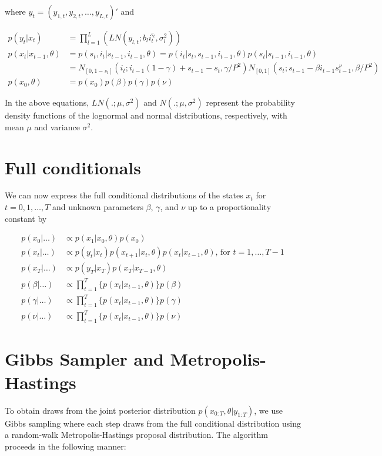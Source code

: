 \documentclass{article}
\begin{document}
\noindent where $y_t = (y_{1,t},y_{2,t},\ldots,y_{L,t})'$ and

\begin{align*}
p(y_t|x_t) &= \prod_{l=1}^L \left(LN(y_{l,t};b_li_t^{\varsigma_l},\sigma_l^2)\right) \\
p(x_t|x_{t-1},\theta) &= p(s_t,i_t|s_{t-1},i_{t-1},\theta) = p(i_t|s_t,s_{t-1},i_{t-1},\theta)p(s_t|s_{t-1},i_{t-1},\theta) \\
&= N_{[0,1-s_t]}(i_t;i_{t-1}(1 - \gamma) + s_{t-1} - s_t, \gamma / P^2)N_{[0,1]}(s_t; s_{t-1} - \beta i_{t-1}s^{\nu}_{t-1}, \beta / P^2) \\
p(x_0,\theta) &= p(x_0)p(\beta)p(\gamma)p(\nu)
\end{align*}

\noindent In the above equations, $LN(.;\mu,\sigma^2)$ and $N(.;\mu,\sigma^2)$ represent the probability density functions of the lognormal and normal distributions, respectively, with mean $\mu$ and variance $\sigma^2$.

\section{Full conditionals} \label{sec:fullcond}
We can now express the full conditional distributions of the states $x_t$ for $t = 0, 1, \ldots, T$ and unknown parameters $\beta$, $\gamma$, and $\nu$ up to a proportionality constant by

\begin{align*}
p(x_0|\hdots) &\propto p(x_1|x_0,\theta)p(x_0) \\
p(x_t|\hdots) &\propto p(y_t|x_t)p(x_{t+1}|x_t,\theta)p(x_t|x_{t-1},\theta) \mbox{, for } t = 1,\ldots,T-1 \\
p(x_T|\hdots) &\propto p(y_T|x_T)p(x_T|x_{T-1},\theta) \\
p(\beta|\hdots) &\propto \prod_{t=1}^T \{p(x_t|x_{t-1},\theta)\}p(\beta) \\
p(\gamma|\hdots) &\propto \prod_{t=1}^T \{p(x_t|x_{t-1},\theta)\}p(\gamma) \\
p(\nu|\hdots) &\propto \prod_{t=1}^T \{p(x_t|x_{t-1},\theta)\}p(\nu)
\end{align*}

\section{Gibbs Sampler and Metropolis-Hastings} \label{sec:gibbs}

To obtain draws from the joint posterior distribution $p(x_{0:T},\theta|y_{1:T})$, we use Gibbs sampling where each step draws from the full conditional distribution using a random-walk Metropolis-Hastings proposal distribution. The algorithm proceeds in the following manner:
\end{document}
